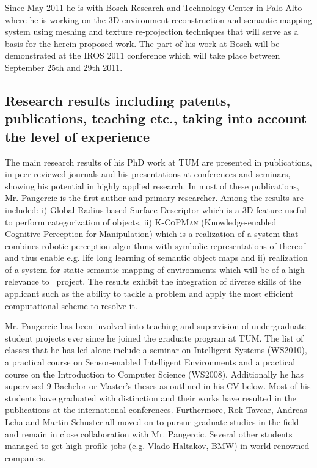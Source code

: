 Since May 2011 he is with Bosch Research and Technology Center in Palo Alto where he is working 
on the 3D environment reconstruction and semantic mapping system using meshing and texture re-projection
techniques that will serve as a basis for the herein proposed work. The part of his work at Bosch will 
be demonstrated at the IROS 2011 conference which will take place between September 25th and 29th 2011.
\subsection{Research results including patents, publications, teaching etc., taking into account the level 
of experience} 
The main research results of his PhD work at TUM are presented in publications, in
peer-reviewed journals and his presentations at conferences and seminars, showing his 
potential in highly applied research. In most of these publications, Mr. Pangercic is the  first 
author and primary researcher. Among the results are included: i) Global Radius-based Surface
Descriptor which is a 3D feature useful to perform categorization of objects, ii) \textsc{K-CoPMan}
(Knowledge-enabled Cognitive Perception for Manipulation) which is a realization of a system that 
combines robotic perception algorithms with symbolic representations of thereof and thus enable
e.g. life long learning of semantic object maps and ii) realization of
a system for static semantic mapping of environments which will be of a high relevance to \ksem\ project.
The results exhibit the integration of diverse skills of the applicant such as the ability  to tackle 
a problem and apply the most efficient computational scheme to resolve it.

Mr. Pangercic has been involved into teaching and supervision of undergraduate 
student projects ever since he joined the graduate program at TUM. The list of classes 
that he has led alone include a seminar on Intelligent Systems (WS2010), a practical 
course on Sensor-enabled Intelligent Environments and a practical course on the 
Introduction to Computer Science (WS2008). Additionally he has supervised 9 Bachelor
or Master's theses as outlined in his CV below. Most of his students have graduated
with distinction and their works have resulted in the publications at the international
conferences. Furthermore, Rok Tavcar, Andreas Leha and Martin Schuster all moved on 
to pursue graduate studies in the field and remain in close collaboration with Mr. Pangercic.
Several other students managed to get high-profile jobs (e.g. Vlado Haltakov, BMW) in world renowned 
companies. 

